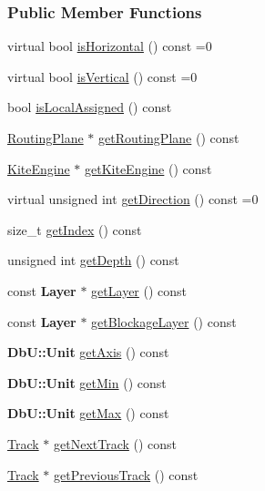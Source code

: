\subsubsection*{Public Member Functions}
\begin{DoxyCompactItemize}
\item 
virtual bool \hyperlink{classKite_1_1Track_a9d3db1f8a5aca58f8f54d291faebf873}{is\-Horizontal} () const =0
\item 
virtual bool \hyperlink{classKite_1_1Track_a6fa2bf0568a2b295dd7cd1f7207247d5}{is\-Vertical} () const =0
\item 
bool \hyperlink{classKite_1_1Track_ac9f5f43a21bc7b63a1237e10b5a6a53b}{is\-Local\-Assigned} () const 
\item 
\hyperlink{classKite_1_1RoutingPlane}{Routing\-Plane} $\ast$ \hyperlink{classKite_1_1Track_a3f7a5bbb3140598c747b1526998e6be7}{get\-Routing\-Plane} () const 
\item 
\hyperlink{classKite_1_1KiteEngine}{Kite\-Engine} $\ast$ \hyperlink{classKite_1_1Track_a9ccc00efc7079210bc25122921382da4}{get\-Kite\-Engine} () const 
\item 
virtual unsigned int \hyperlink{classKite_1_1Track_ae35b78590ed6aa546b626ef95f28c533}{get\-Direction} () const =0
\item 
size\-\_\-t \hyperlink{classKite_1_1Track_a65742a66b3c3b66d5b619db492469900}{get\-Index} () const 
\item 
unsigned int \hyperlink{classKite_1_1Track_ad43be8bb2a3c8247405feef4fa973734}{get\-Depth} () const 
\item 
const {\bf Layer} $\ast$ \hyperlink{classKite_1_1Track_ac1bbd63624eb1b4e394301c92adef62c}{get\-Layer} () const 
\item 
const {\bf Layer} $\ast$ \hyperlink{classKite_1_1Track_aceadd4784a0ae6394d2c75433f81ce59}{get\-Blockage\-Layer} () const 
\item 
{\bf Db\-U\-::\-Unit} \hyperlink{classKite_1_1Track_af85576c58c70007850ad56e238e8d266}{get\-Axis} () const 
\item 
{\bf Db\-U\-::\-Unit} \hyperlink{classKite_1_1Track_a75e87715af5a758c37e5f1faeaf7ccc1}{get\-Min} () const 
\item 
{\bf Db\-U\-::\-Unit} \hyperlink{classKite_1_1Track_a204f3392bd6abab056796ecdae72ce54}{get\-Max} () const 
\item 
\hyperlink{classKite_1_1Track}{Track} $\ast$ \hyperlink{classKite_1_1Track_ab83ae7101fae68a7db48b96a82cc42f5}{get\-Next\-Track} () const 
\item 
\hyperlink{classKite_1_1Track}{Track} $\ast$ \hyperlink{classKite_1_1Track_a0647664eabb2f70005585316c3681b7f}{get\-Previous\-Track} () const 

\end{DoxyCompactItemize}
